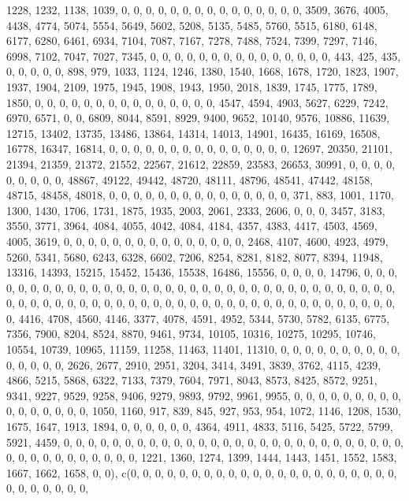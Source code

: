 \documentclass[
]{article}
\begin{document}
1228, 1232, 1138, 1039, 0, 0, 0, 0, 0, 0, 0, 0, 0, 0, 0, 0, 0, 0, 0,
3509, 3676, 4005, 4438, 4774, 5074, 5554, 5649, 5602, 5208, 5135, 5485,
5760, 5515, 6180, 6148, 6177, 6280, 6461, 6934, 7104, 7087, 7167, 7278,
7488, 7524, 7399, 7297, 7146, 6998, 7102, 7047, 7027, 7345, 0, 0, 0, 0,
0, 0, 0, 0, 0, 0, 0, 0, 0, 0, 0, 443, 425, 435, 0, 0, 0, 0, 0, 898, 979,
1033, 1124, 1246, 1380, 1540, 1668, 1678, 1720, 1823, 1907, 1937, 1904,
2109, 1975, 1945, 1908, 1943, 1950, 2018, 1839, 1745, 1775, 1789, 1850,
0, 0, 0, 0, 0, 0, 0, 0, 0, 0, 0, 0, 0, 0, 0, 4547, 4594, 4903, 5627,
6229, 7242, 6970, 6571, 0, 0, 6809, 8044, 8591, 8929, 9400, 9652, 10140,
9576, 10886, 11639, 12715, 13402, 13735, 13486, 13864, 14314, 14013,
14901, 16435, 16169, 16508, 16778, 16347, 16814, 0, 0, 0, 0, 0, 0, 0, 0,
0, 0, 0, 0, 0, 0, 0, 12697, 20350, 21101, 21394, 21359, 21372, 21552,
22567, 21612, 22859, 23583, 26653, 30991, 0, 0, 0, 0, 0, 0, 0, 0, 0,
48867, 49122, 49442, 48720, 48111, 48796, 48541, 47442, 48158, 48715,
48458, 48018, 0, 0, 0, 0, 0, 0, 0, 0, 0, 0, 0, 0, 0, 0, 0, 371, 883,
1001, 1170, 1300, 1430, 1706, 1731, 1875, 1935, 2003, 2061, 2333, 2606,
0, 0, 0, 3457, 3183, 3550, 3771, 3964, 4084, 4055, 4042, 4084, 4184,
4357, 4383, 4417, 4503, 4569, 4005, 3619, 0, 0, 0, 0, 0, 0, 0, 0, 0, 0,
0, 0, 0, 0, 0, 2468, 4107, 4600, 4923, 4979, 5260, 5341, 5680, 6243,
6328, 6602, 7206, 8254, 8281, 8182, 8077, 8394, 11948, 13316, 14393,
15215, 15452, 15436, 15538, 16486, 15556, 0, 0, 0, 0, 14796, 0, 0, 0, 0,
0, 0, 0, 0, 0, 0, 0, 0, 0, 0, 0, 0, 0, 0, 0, 0, 0, 0, 0, 0, 0, 0, 0, 0,
0, 0, 0, 0, 0, 0, 0, 0, 0, 0, 0, 0, 0, 0, 0, 0, 0, 0, 0, 0, 0, 0, 0, 0,
0, 0, 0, 0, 0, 0, 0, 0, 0, 0, 0, 0, 0, 0, 0, 0, 4416, 4708, 4560, 4146,
3377, 4078, 4591, 4952, 5344, 5730, 5782, 6135, 6775, 7356, 7900, 8204,
8524, 8870, 9461, 9734, 10105, 10316, 10275, 10295, 10746, 10554, 10739,
10965, 11159, 11258, 11463, 11401, 11310, 0, 0, 0, 0, 0, 0, 0, 0, 0, 0,
0, 0, 0, 0, 0, 2626, 2677, 2910, 2951, 3204, 3414, 3491, 3839, 3762,
4115, 4239, 4866, 5215, 5868, 6322, 7133, 7379, 7604, 7971, 8043, 8573,
8425, 8572, 9251, 9341, 9227, 9529, 9258, 9406, 9279, 9893, 9792, 9961,
9955, 0, 0, 0, 0, 0, 0, 0, 0, 0, 0, 0, 0, 0, 0, 0, 0, 1050, 1160, 917,
839, 845, 927, 953, 954, 1072, 1146, 1208, 1530, 1675, 1647, 1913, 1894,
0, 0, 0, 0, 0, 0, 4364, 4911, 4833, 5116, 5425, 5722, 5799, 5921, 4459,
0, 0, 0, 0, 0, 0, 0, 0, 0, 0, 0, 0, 0, 0, 0, 0, 0, 0, 0, 0, 0, 0, 0, 0,
0, 0, 0, 0, 0, 0, 0, 0, 0, 0, 0, 0, 0, 0, 0, 1221, 1360, 1274, 1399,
1444, 1443, 1451, 1552, 1583, 1667, 1662, 1658, 0, 0), c(0, 0, 0, 0, 0,
0, 0, 0, 0, 0, 0, 0, 0, 0, 0, 0, 0, 0, 0, 0, 0, 0, 0, 0, 0, 0, 0, 0, 0,
\end{document}
